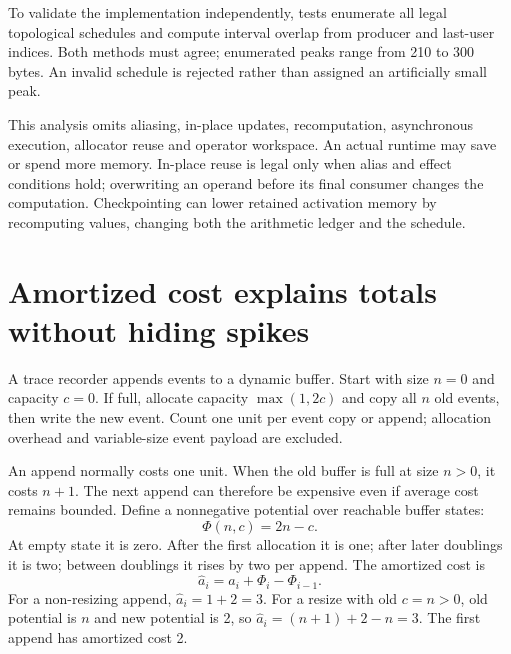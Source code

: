 To validate the implementation independently, tests enumerate all legal
topological schedules and compute interval overlap from producer and last-user
indices. Both methods must agree; enumerated peaks range from 210 to 300 bytes.
An invalid schedule is rejected rather than assigned an artificially small peak.

This analysis omits aliasing, in-place updates, recomputation, asynchronous
execution, allocator reuse and operator workspace. An actual runtime may save
or spend more memory. In-place reuse is legal only when alias and effect
conditions hold; overwriting an operand before its final consumer changes the
computation. Checkpointing can lower retained activation memory by recomputing
values, changing both the arithmetic ledger and the schedule.

\section{Amortized cost explains totals without hiding spikes}
A trace recorder appends events to a dynamic buffer. Start with size $n=0$
and capacity $c=0$. If full, allocate capacity $\max(1,2c)$ and copy all $n$
old events, then write the new event. Count one unit per event copy or append;
allocation overhead and variable-size event payload are excluded.

An append normally costs one unit. When the old buffer is full at size $n>0$,
it costs $n+1$. The next append can therefore be expensive even if average
cost remains bounded.
Define a nonnegative potential over reachable buffer states:
\begin{equation}
 \Phi(n,c)=2n-c.
\end{equation}
At empty state it is zero. After the first allocation it is one; after later
doublings it is two; between doublings it rises by two per append.
The amortized cost is
\begin{equation}
 \widehat a_i=a_i+\Phi_i-\Phi_{i-1}.
 \label{eq:amort}
\end{equation}
For a non-resizing append, $\widehat a_i=1+2=3$.
For a resize with old $c=n>0$, old potential is $n$ and new potential is 2,
so $\widehat a_i=(n+1)+2-n=3$.
The first append has amortized cost 2.

\begin{center}\end{center}

